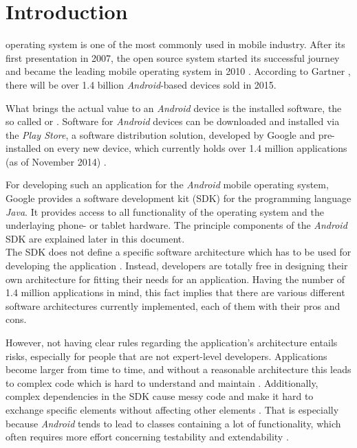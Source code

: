 \section{Introduction}

 operating system is one of the most 
commonly used in mobile industry. After its first presentation in 2007, the open source system started its successful journey and became the leading mobile operating system in 2010 \cite{PassiveMVC}. According to Gartner \cite{GartnerAndroid2015}, there will be over 1.4 billion \emph{Android}-based devices sold in 2015.

What brings the actual value to an \emph{Android} device is the installed software, the so called  or 
.
Software for \emph{Android} devices can be downloaded and installed via the 
\emph{Play Store}, a software distribution solution, developed by Google and 
pre-installed on every new device, which currently holds over 1.4 million 
applications (as of November 2014) \cite{AppBrainStats}.


For developing such an application for the \emph{Android} mobile operating 
system, Google provides a software development kit (SDK) for the programming 
language \emph{Java}. It provides access to all functionality of the 
operating system and the underlaying phone- or tablet hardware. The principle components of the \emph{Android} SDK are explained later in this document.\\


The SDK does not define a specific software architecture which has to 
be used for developing the application \cite{AndroidDeveloperCollection}. Instead, developers are totally free in 
designing their own architecture for fitting their needs for an application.
Having the number of 1.4 million applications in mind, this fact implies that 
there are various different software architectures currently implemented, each 
of them with their pros and cons. 

However, not having clear rules regarding the application's architecture entails risks, especially for people that are not expert-level developers. Applications become larger from time to time, and without a reasonable architecture this leads to complex code which is hard to understand and maintain \cite{PassiveMVC, BallOfMud}. Additionally, complex dependencies in the SDK cause messy code and make it hard to exchange specific elements without affecting other elements \cite{PassiveMVC}. That is especially because \emph{Android} tends to lead to classes containing a lot of functionality, which often requires more effort concerning testability and extendability \cite{GangOfFour}.

